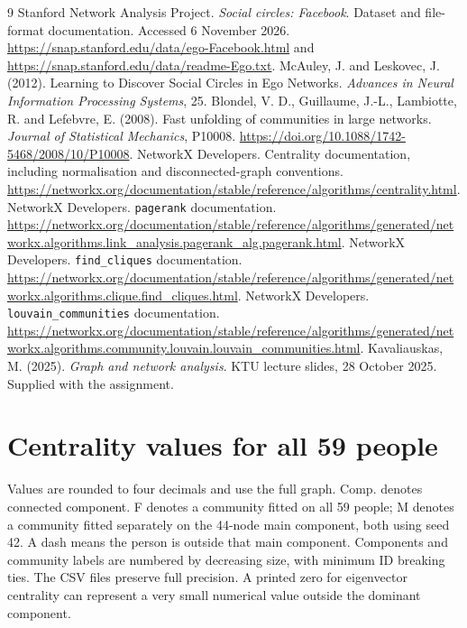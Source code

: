 \documentclass[11pt,a4paper]{article}
\begin{document}
\begin{thebibliography}{9}\small
{} Stanford Network Analysis Project. \emph{Social circles: Facebook}.
Dataset and file-format documentation. Accessed 6 November 2026.
\url{https://snap.stanford.edu/data/ego-Facebook.html} and
\url{https://snap.stanford.edu/data/readme-Ego.txt}.
 McAuley, J. and Leskovec, J. (2012).
Learning to Discover Social Circles in Ego Networks.
\emph{Advances in Neural Information Processing Systems}, 25.
 Blondel, V. D., Guillaume, J.-L., Lambiotte, R. and
Lefebvre, E. (2008). Fast unfolding of communities in large networks.
\emph{Journal of Statistical Mechanics}, P10008.
\url{https://doi.org/10.1088/1742-5468/2008/10/P10008}.
 NetworkX Developers. Centrality documentation, including
normalisation and disconnected-graph conventions.
\url{https://networkx.org/documentation/stable/reference/algorithms/centrality.html}.
 NetworkX Developers. \texttt{pagerank} documentation.
\url{https://networkx.org/documentation/stable/reference/algorithms/generated/networkx.algorithms.link_analysis.pagerank_alg.pagerank.html}.
 NetworkX Developers. \texttt{find\_cliques} documentation.
\url{https://networkx.org/documentation/stable/reference/algorithms/generated/networkx.algorithms.clique.find_cliques.html}.
 NetworkX Developers. \texttt{louvain\_communities} documentation.
\url{https://networkx.org/documentation/stable/reference/algorithms/generated/networkx.algorithms.community.louvain.louvain_communities.html}.
 Kavaliauskas, M. (2025). \emph{Graph and network analysis}.
KTU lecture slides, 28 October 2025. Supplied with the assignment.
\end{thebibliography}

\clearpage
\appendix
\section{Centrality values for all 59 people}\label{app:centrality}
Values are rounded to four decimals and use the full graph. Comp. denotes
connected component. F denotes a community fitted on all 59 people; M denotes a
community fitted separately on the 44-node main component, both using seed 42.
A dash means the person is outside that main component. Components and community
labels are numbered by decreasing size, with minimum ID breaking ties.
The CSV files preserve full precision. A printed zero for eigenvector
centrality can represent a very small numerical value outside the dominant component.
\begingroup\fontsize{8.5}{10}\selectfont
\renewcommand{\arraystretch}{0.96}
\setlength{\tabcolsep}{4.5pt}

\endgroup
\end{document}
